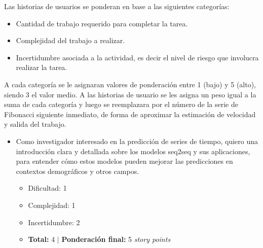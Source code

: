 \documentclass[
11pt, %
]{charter}
\begin{document}
%
%
%

Las historias de usuarios se ponderan en base a las siguientes categorías:
\begin{itemize}
	\item Cantidad de trabajo requerido para completar la tarea.
	\item Complejidad del trabajo a realizar.
	\item Incertidumbre asociada a la actividad, es decir el nivel de riesgo que involucra realizar la tarea.
\end{itemize}

A cada categoría se le asignaran valores de ponderación entre 1 (bajo) y 5 (alto), siendo 3 el valor medio. A las historias de usuario se les asigna un peso igual a la suma de cada categoría y luego se reemplazara por el número de la serie de Fibonacci siguiente inmediato, de forma de aproximar la estimación de velocidad y salida del trabajo.

\begin{itemize}
	\item Como investigador interesado en la predicción de series de tiempo, quiero una introducción clara y detallada sobre los modelos seq2seq y sus aplicaciones, para entender cómo estos modelos pueden mejorar las predicciones en contextos demográficos y otros campos.
	\begin{itemize}
		\item Dificultad: 	1
		\item Complejidad: 	1
		\item Incertidumbre: 2
		\item \textbf{Total:} 4 $|$ \textbf{Ponderación final:} 5 \textit{story points}
	\end{itemize}
\end{itemize}
\end{document}
